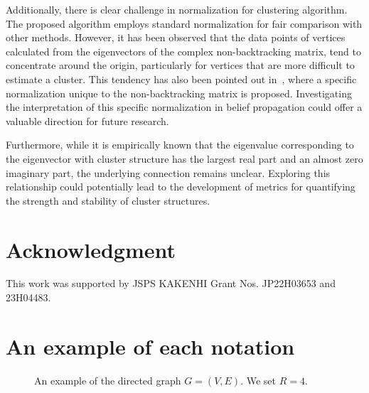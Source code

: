 \documentclass{article}
\theoremstyle{plain}
\begin{document}
Additionally, there is clear challenge in normalization for clustering algorithm.
The proposed algorithm employs standard normalization for fair comparison with other methods.
However, it has been observed that the data points of vertices calculated from the eigenvectors of the complex non-backtracking matrix, tend to concentrate around the origin, particularly for vertices that are more difficult to estimate a cluster.
This tendency has also been pointed out in~\citep{Newman2013-zc}, where a specific normalization unique to the non-backtracking matrix is proposed.
Investigating the interpretation of this specific normalization in belief propagation could offer a valuable direction for future research.

Furthermore, while it is empirically known that
the eigenvalue corresponding to the eigenvector with cluster structure has the largest real part
and an almost zero imaginary part, the underlying connection remains unclear.
Exploring this relationship could potentially lead to the development of metrics for quantifying the strength and stability of cluster structures.

\section*{Acknowledgment}
This work was supported by JSPS KAKENHI Grant Nos. JP22H03653 and 23H04483.

\appendix

\section{An example of each notation}\label{appendix:notations}

\begin{figure}[tb]
	\centering
	\caption{An example of the directed graph $G=(V, E)$. We set $R=4$.}
	\label{figure1:appendix:notations}
\end{figure}
\end{document}
